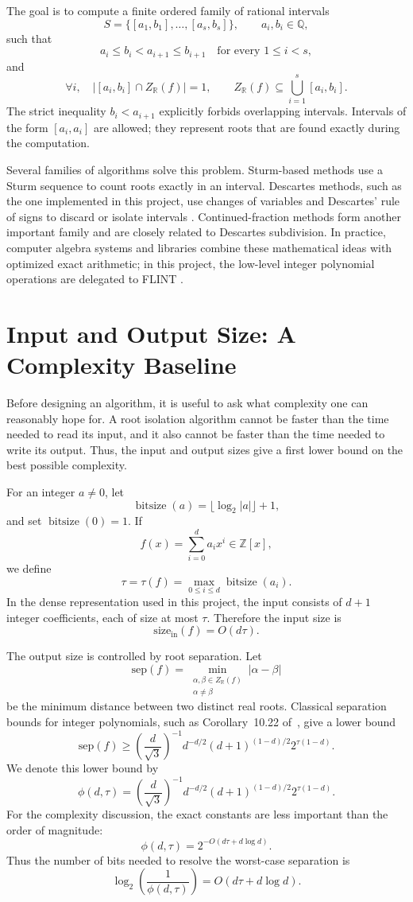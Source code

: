 \documentclass[letterpaper]{article}
\newcommand{\RR}{\mathbb{R}}
\newcommand{\ZZ}{\mathbb{Z}}
\newcommand{\roots}{Z_{\RR}}
\newcommand{\sep}{\mathrm{sep}}
\newcommand{\size}{\mathrm{size}}
\newcommand{\bitsize}{\operatorname{bitsize}}
\newcommand{\citecorollary}[2][]{Corollary~#1 of~\cite{#2}}
\begin{document}
The goal is to compute a finite ordered family of rational intervals
\[
  S=\{[a_1,b_1],\ldots,[a_s,b_s]\},
  \qquad a_i,b_i\in\mathbb{Q},
\]
such that
\[
  a_i\leq b_i < a_{i+1}\leq b_{i+1}
  \quad\text{for every } 1\leq i<s,
\]
and
\[
  \forall i,\quad |[a_i,b_i]\cap\roots(f)|=1,
  \qquad
  \roots(f)\subseteq \bigcup_{i=1}^{s}[a_i,b_i].
\]
The strict inequality $b_i<a_{i+1}$ explicitly forbids overlapping intervals.
Intervals of the form $[a_i,a_i]$ are allowed; they represent roots that are
found exactly during the computation.

Several families of algorithms solve this problem. Sturm-based methods use a
Sturm sequence to count roots exactly in an interval. Descartes methods, such
as the one implemented in this project, use changes of variables and
Descartes' rule of signs to discard or isolate intervals
\cite{collinsAkritas1976,rouillierZimmermann2004}. Continued-fraction methods
form another important family and are closely related to Descartes
subdivision. In practice, computer algebra systems and libraries combine these
mathematical ideas with optimized exact arithmetic; in this project, the
low-level integer polynomial operations are delegated to FLINT \cite{flint}.

\section{Input and Output Size: A Complexity Baseline}

Before designing an algorithm, it is useful to ask what complexity one can
reasonably hope for. A root isolation algorithm cannot be faster than the time
needed to read its input, and it also cannot be faster than the time needed to
write its output. Thus, the input and output sizes give a first lower bound on
the best possible complexity.

For an integer $a\neq 0$, let
\[
  \bitsize(a)=\lfloor \log_2 |a| \rfloor + 1,
\]
and set $\bitsize(0)=1$. If
\[
  f(x)=\sum_{i=0}^{d}a_i x^i \in \ZZ[x],
\]
we define
\[
  \tau=\tau(f)=\max_{0\leq i\leq d}\bitsize(a_i).
\]
In the dense representation used in this project, the input consists of
$d+1$ integer coefficients, each of size at most $\tau$. Therefore the input
size is
\[
  \size_{\mathrm{in}}(f)=O(d\tau).
\]

The output size is controlled by root separation. Let
\[
  \sep(f)=
  \min_{\substack{\alpha,\beta\in\roots(f)\\ \alpha\neq\beta}}
  |\alpha-\beta|
\]
be the minimum distance between two distinct real roots. Classical separation
bounds for integer polynomials, such as \citecorollary[10.22]{basuPollackRoy2006},
give a lower bound
\[
  \sep(f)
  \geq
  \left(\frac{d}{\sqrt{3}}\right)^{-1}
  d^{-d/2}
  (d+1)^{(1-d)/2}
  2^{\tau(1-d)}.
\]
We denote this lower bound by
\[
  \phi(d,\tau)
  =
  \left(\frac{d}{\sqrt{3}}\right)^{-1}
  d^{-d/2}
  (d+1)^{(1-d)/2}
  2^{\tau(1-d)}.
\]
For the complexity discussion, the exact constants are less important than the
order of magnitude:
\[
  \phi(d,\tau)=2^{-O(d\tau+d\log d)}.
\]
Thus the number of bits needed to resolve the worst-case separation is
\[
  \log_2\!\left(\frac{1}{\phi(d,\tau)}\right)
  =O(d\tau+d\log d).
\]
\end{document}
